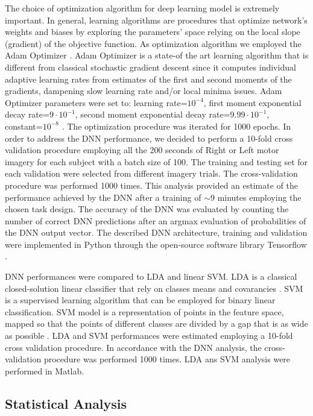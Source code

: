\documentclass[12pt ]{iopart}
\begin{document}
 The choice of optimization algorithm for deep learning model is extremely important.
 In general, learning algorithms are procedures that optimize network's weights and biases by exploring the parameters' space relying  on the local  slope (gradient) of the objective function.  
 As optimization algorithm we employed the Adam Optimizer \parencite{kingma2014adam}.
Adam Optimizer is a state-of the art learning algorithm that is different from classical stochastic gradient descent since it computes individual adaptive learning rates from estimates of the first and second moments of the gradients, dampening slow learning rate and/or local minima issues.
Adam Optimizer parameters were set to: learning rate=$10^{-4}$, first moment exponential decay rate=$9\cdot 10^{-1}$,  second moment exponential decay rate=$9.99\cdot 10^{-1}$, constant=$10^{-8}$ \parencite{kingma2014adam}.
The optimization procedure was iterated for 1000 epochs.
In order to address the DNN performance, we decided to perform a 10-fold cross validation procedure \parencite{kohavi1995study} employing all the 200 seconds of Right or Left motor imagery for each subject with a batch size of 100. 
The training and testing set for each validation were selected from different imagery trials.
The cross-validation procedure was performed 1000 times. 
This analysis provided an estimate of the performance achieved by the DNN after a training of $\sim$9 minutes employing the chosen task design. 
The accuracy of the DNN was evaluated by counting the number of correct DNN predictions after an argmax evaluation of probabilities of the DNN output vector.
The described DNN architecture, training and validation were implemented in Python  through the open-source software library Tensorflow \parencite{abadi2016tensorflow}.

DNN performances were compared to LDA and linear SVM.
LDA is a classical closed-solution linear classifier that rely on classes means and covarancies \parencite{balakrishnama1998linear}.
SVM is a supervised learning algorithm that can be employed for binary linear classification. SVM model is a representation of  points in the feature space, mapped so that the points of different classes are divided by a gap that is as wide as possible \parencite{cortes1995support}.
LDA and SVM performances were estimated employing  a 10-fold cross validation procedure. In accordance with the DNN analysis,  the cross-validation procedure was performed 1000 times. 
LDA ans SVM analysis were performed in Matlab.

\subsection{Statistical Analysis}
\end{document}
